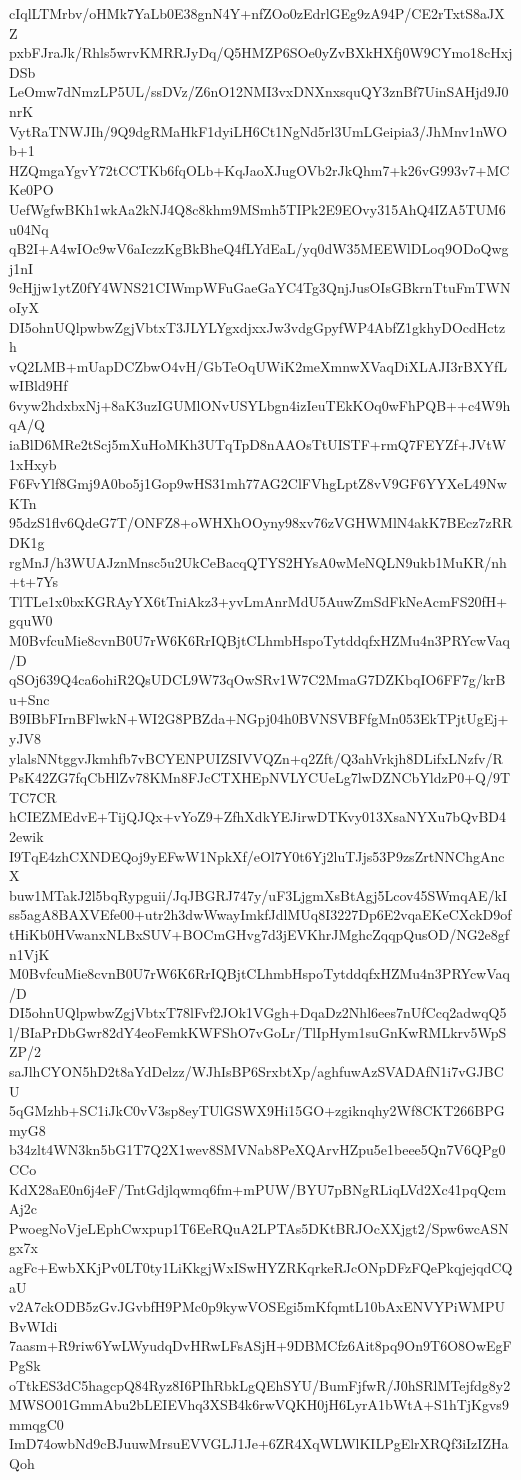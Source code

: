 cIqlLTMrbv/oHMk7YaLb0E38gnN4Y+nfZOo0zEdrlGEg9zA94P/CE2rTxtS8aJXZ
pxbFJraJk/Rhls5wrvKMRRJyDq/Q5HMZP6SOe0yZvBXkHXfj0W9CYmo18cHxjDSb
LeOmw7dNmzLP5UL/ssDVz/Z6nO12NMI3vxDNXnxsquQY3znBf7UinSAHjd9J0nrK
VytRaTNWJIh/9Q9dgRMaHkF1dyiLH6Ct1NgNd5rl3UmLGeipia3/JhMnv1nWOb+1
HZQmgaYgvY72tCCTKb6fqOLb+KqJaoXJugOVb2rJkQhm7+k26vG993v7+MCKe0PO
UefWgfwBKh1wkAa2kNJ4Q8c8khm9MSmh5TIPk2E9EOvy315AhQ4IZA5TUM6u04Nq
qB2I+A4wIOc9wV6aIczzKgBkBheQ4fLYdEaL/yq0dW35MEEWlDLoq9ODoQwgj1nI
9cHjjw1ytZ0fY4WNS21CIWmpWFuGaeGaYC4Tg3QnjJusOIsGBkrnTtuFmTWNoIyX
DI5ohnUQlpwbwZgjVbtxT3JLYLYgxdjxxJw3vdgGpyfWP4AbfZ1gkhyDOcdHctzh
vQ2LMB+mUapDCZbwO4vH/GbTeOqUWiK2meXmnwXVaqDiXLAJI3rBXYfLwIBld9Hf
6vyw2hdxbxNj+8aK3uzIGUMlONvUSYLbgn4izIeuTEkKOq0wFhPQB++c4W9hqA/Q
iaBlD6MRe2tScj5mXuHoMKh3UTqTpD8nAAOsTtUISTF+rmQ7FEYZf+JVtW1xHxyb
F6FvYlf8Gmj9A0bo5j1Gop9wHS31mh77AG2ClFVhgLptZ8vV9GF6YYXeL49NwKTn
95dzS1flv6QdeG7T/ONFZ8+oWHXhOOyny98xv76zVGHWMlN4akK7BEcz7zRRDK1g
rgMnJ/h3WUAJznMnsc5u2UkCeBacqQTYS2HYsA0wMeNQLN9ukb1MuKR/nh+t+7Ys
TlTLe1x0bxKGRAyYX6tTniAkz3+yvLmAnrMdU5AuwZmSdFkNeAcmFS20fH+gquW0
M0BvfcuMie8cvnB0U7rW6K6RrIQBjtCLhmbHspoTytddqfxHZMu4n3PRYcwVaq/D
qSOj639Q4ca6ohiR2QsUDCL9W73qOwSRv1W7C2MmaG7DZKbqIO6FF7g/krBu+Snc
B9IBbFIrnBFlwkN+WI2G8PBZda+NGpj04h0BVNSVBFfgMn053EkTPjtUgEj+yJV8
ylalsNNtggvJkmhfb7vBCYENPUIZSIVVQZn+q2Zft/Q3ahVrkjh8DLifxLNzfv/R
PsK42ZG7fqCbHlZv78KMn8FJcCTXHEpNVLYCUeLg7lwDZNCbYldzP0+Q/9TTC7CR
hCIEZMEdvE+TijQJQx+vYoZ9+ZfhXdkYEJirwDTKvy013XsaNYXu7bQvBD42ewik
I9TqE4zhCXNDEQoj9yEFwW1NpkXf/eOl7Y0t6Yj2luTJjs53P9zsZrtNNChgAncX
buw1MTakJ2l5bqRypguii/JqJBGRJ747y/uF3LjgmXsBtAgj5Lcov45SWmqAE/kI
ss5agA8BAXVEfe00+utr2h3dwWwayImkfJdlMUq8I3227Dp6E2vqaEKeCXckD9of
tHiKb0HVwanxNLBxSUV+BOCmGHvg7d3jEVKhrJMghcZqqpQusOD/NG2e8gfn1VjK
M0BvfcuMie8cvnB0U7rW6K6RrIQBjtCLhmbHspoTytddqfxHZMu4n3PRYcwVaq/D
DI5ohnUQlpwbwZgjVbtxT78lFvf2JOk1VGgh+DqaDz2Nhl6ees7nUfCcq2adwqQ5
l/BIaPrDbGwr82dY4eoFemkKWFShO7vGoLr/TlIpHym1suGnKwRMLkrv5WpSZP/2
saJlhCYON5hD2t8aYdDelzz/WJhIsBP6SrxbtXp/aghfuwAzSVADAfN1i7vGJBCU
5qGMzhb+SC1iJkC0vV3sp8eyTUlGSWX9Hi15GO+zgiknqhy2Wf8CKT266BPGmyG8
b34zlt4WN3kn5bG1T7Q2X1wev8SMVNab8PeXQArvHZpu5e1beee5Qn7V6QPg0CCo
KdX28aE0n6j4eF/TntGdjlqwmq6fm+mPUW/BYU7pBNgRLiqLVd2Xc41pqQcmAj2c
PwoegNoVjeLEphCwxpup1T6EeRQuA2LPTAs5DKtBRJOcXXjgt2/Spw6wcASNgx7x
agFc+EwbXKjPv0LT0ty1LiKkgjWxISwHYZRKqrkeRJcONpDFzFQePkqjejqdCQaU
v2A7ckODB5zGvJGvbfH9PMc0p9kywVOSEgi5mKfqmtL10bAxENVYPiWMPUBvWIdi
7aasm+R9riw6YwLWyudqDvHRwLFsASjH+9DBMCfz6Ait8pq9On9T6O8OwEgFPgSk
oTtkES3dC5hagcpQ84Ryz8I6PIhRbkLgQEhSYU/BumFjfwR/J0hSRlMTejfdg8y2
MWSO01GmmAbu2bLEIEVhq3XSB4k6rwVQKH0jH6LyrA1bWtA+S1hTjKgvs9mmqgC0
ImD74owbNd9cBJuuwMrsuEVVGLJ1Je+6ZR4XqWLWlKILPgElrXRQf3iIzIZHaQoh
